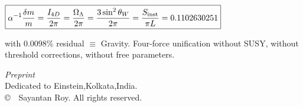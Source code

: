 \documentclass[a4paper,7pt,oneside,openany]{book}
\begin{document}
\begin{titlepage}
\begin{minipage}{0.88\textwidth}
\vspace{0.3cm}
\large
$\displaystyle \boxed{
\alpha^{-1}\frac{\delta m}{m}= \frac{I_{4D}}{2\pi}= \frac{\Omega_\Lambda}{2\pi}= \frac{3\sin^2\theta_W}{2\pi}= \frac{S_{\rm inst}}{\pi L}=0.1102630251}$

\vspace{0.3cm}
\footnotesize
with $0.0098\%$ residual $\equiv$ Gravity. Four-force unification without SUSY, without threshold corrections, without free parameters.
\end{minipage}

\vfill

\begin{minipage}{0.85\textwidth}
\centering
\footnotesize
\textit{Preprint}\\[2pt]
Dedicated to Einstein,Kolkata,India.\\[2pt]
\copyright\ \the\year\ Sayantan Roy. All rights reserved.
\end{minipage}

\vspace{0.3cm}

\end{titlepage}
\end{document}
